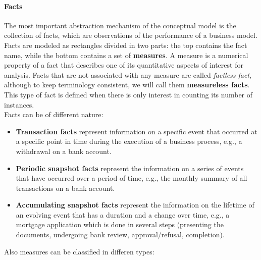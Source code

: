 \paragraph{Facts} The most important abstraction mechanism of the conceptual model is the collection of facts, which are observations of the performance of a business model. Facts are modeled as rectangles divided in two parts: the top contains the fact name, while the bottom contains a set of \textbf{measures}. A measure is a numerical property of a fact that describes one of its quantitative aspects of interest for analysis. Facts that are not associated with any measure are called \textit{factless fact}, although to keep terminology consistent, we will call them \textbf{measureless facts}. This type of fact is defined when there is only interest in counting its number of instances. \\
Facts can be of different nature:
\begin{itemize}
    \item \textbf{Transaction facts} represent information on a specific event that occurred at a specific point in time during the execution of a business process, e.g., a withdrawal on a bank account.
    \item \textbf{Periodic snapshot facts} represent the information on a series of events that have occurred over a period of time, e.g., the monthly summary of all transactions on a bank account.
    \item \textbf{Accumulating snapshot facts} represent the information on the lifetime of an evolving event that has a duration and a change over time, e.g., a mortgage application which is done in several steps (presenting the documents, undergoing bank review, approval/refusal, completion).
\end{itemize}
Also measures can be classified in differen types:
